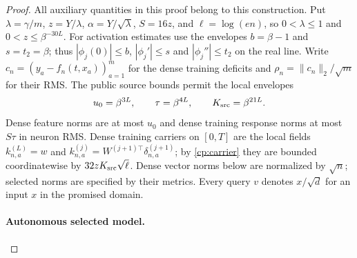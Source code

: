 \begin{proof}
All auxiliary quantities in this proof belong to this construction.
Put $\lambda=\gamma/m$, $z=Y/\lambda$, $\alpha=Y/\sqrt\lambda$,
$S=16z$, and $\ell=\log(en)$, so $0<\lambda\le1$ and
$0<z\le\beta^{-30L}$. For activation estimates use the envelopes
$b=\beta-1$ and $s=t_2=\beta$; thus $|\phi_j(0)|\le b$,
$|\phi_j'|\le s$ and $|\phi_j''|\le t_2$ on the real line.
Write $c_n=(y_a-f_n(t,x_a))_{a=1}^m$ for the dense training deficits and
$\rho_n=\|c_n\|_2/\sqrt m$ for their RMS.
The public source bounds permit the local envelopes
\[
 u_0=\beta^{3L},\qquad \tau=\beta^{4L},\qquad
 K_{\rm src}=\beta^{21L}.
\]
Dense feature norms are at most $u_0$ and dense training response norms
at most $S\tau$ in neuron RMS. Dense training carriers on $[0,T]$
are the local fields
$k_{n,a}^{(L)}=w$ and
$k_{n,a}^{(j)}=W^{(j+1)\top}\delta_{n,a}^{(j+1)}$; by
\eqref{cp:carrier} they are bounded coordinatewise by
$32zK_{\rm src}\sqrt\ell$.
Dense vector norms below are normalized by $\sqrt n$; selected norms
are specified by their metrics. Every query $v$ denotes $x/\sqrt d$
for an input $x$ in the promised domain.

\paragraph{Autonomous selected model.}


\end{proof}
